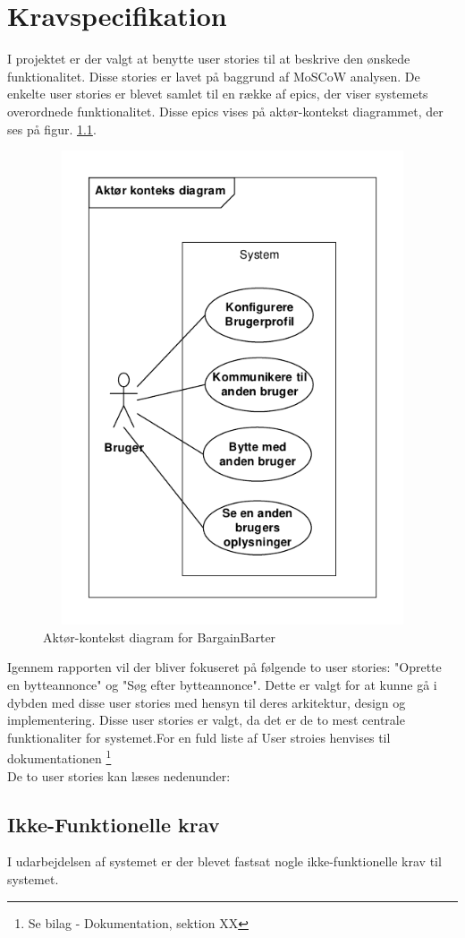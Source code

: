 \chapter{Kravspecifikation}

I projektet er der valgt at benytte user stories til at beskrive den ønskede funktionalitet. Disse stories er lavet på baggrund af MoSCoW analysen.
De enkelte user stories er blevet samlet til en række af epics, der viser systemets overordnede funktionalitet. Disse epics vises på aktør-kontekst diagrammet, der ses på figur. \ref{fig:KontekstDia}. 

\begin{figure}[H]
	\includegraphics[width=140mm,height=140mm]{../Dokumentation/figures/KontekstDiagram.PDF}
	\caption{Aktør-kontekst diagram for BargainBarter}
	\label{fig:KontekstDia}
\end{figure}

Igennem rapporten vil der bliver fokuseret på følgende to user stories: "Oprette en bytteannonce" og "Søg efter bytteannonce". Dette er valgt for at kunne gå i dybden med disse user stories med hensyn til deres arkitektur, design og implementering. Disse user stories er valgt, da det er de to mest centrale funktionaliter for systemet.For en fuld liste af User stroies henvises til dokumentationen \footnote{Se bilag - Dokumentation, sektion XX}\\
De to user stories kan læses nedenunder:




\section{Ikke-Funktionelle krav}
I udarbejdelsen af systemet er der blevet fastsat nogle ikke-funktionelle krav til systemet.
